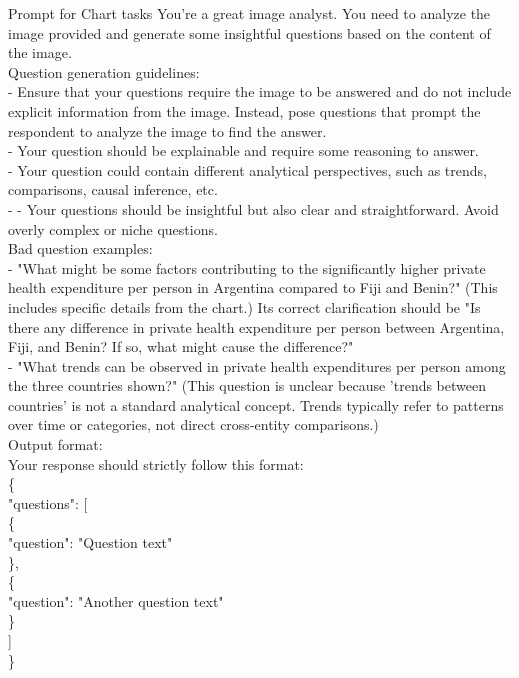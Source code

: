 \begin{figure*}[!ht] 
\begin{AIbox}{Prompt for Chart tasks}
{You're a great image analyst. You need to analyze the image provided and generate some insightful questions based on the content of the image. \\
Question generation guidelines:\\
- Ensure that your questions require the image to be answered and do not include explicit information from the image. Instead, pose questions that prompt the respondent to analyze the image to find the answer.\\
- Your question should be explainable and require some reasoning to answer.\\
- Your question could contain different analytical perspectives, such as trends, comparisons, causal inference, etc.\\
- - Your questions should be insightful but also clear and straightforward. Avoid overly complex or niche questions.\\
Bad question examples:\\
- "What might be some factors contributing to the significantly higher private health expenditure per person in Argentina compared to Fiji and Benin?" (This includes specific details from the chart.) Its correct clarification should be "Is there any difference in private health expenditure per person between Argentina, Fiji, and Benin? If so, what might cause the difference?"\\
- "What trends can be observed in private health expenditures per person among the three countries shown?" (This question is unclear because 'trends between countries' is not a standard analytical concept. Trends typically refer to patterns over time or categories, not direct cross-entity comparisons.)\\
Output format:\\
Your response should strictly follow this format:\\
\{\\
"questions": [\\
\{\\
 "question": "Question text"\\
\},\\
\{\\
"question": "Another question text"\\
\}\\
]\\
\}\\
}
\end{AIbox} 
\caption{\textbf{An Example of the prompt for Chart task generation. }}
\label{fig: prompt_chart}
\end{figure*}

